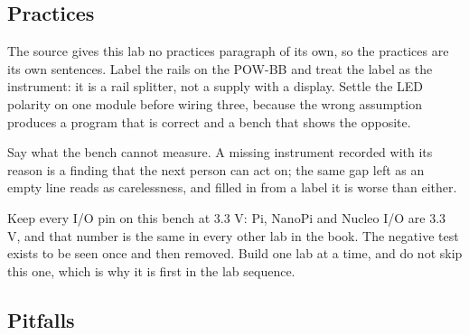 \subsection*{Practices}

The source gives this lab no practices paragraph of its own, so the practices are its own sentences. Label the rails on the POW-BB and treat the label as the instrument: it is a rail splitter, not a supply with a display. Settle the LED polarity on one module before wiring three, because the wrong assumption produces a program that is correct and a bench that shows the opposite.

Say what the bench cannot measure. A missing instrument recorded with its reason is a finding that the next person can act on; the same gap left as an empty line reads as carelessness, and filled in from a label it is worse than either.

Keep every I/O pin on this bench at 3.3 V: Pi, NanoPi and Nucleo I/O are 3.3 V, and that number is the same in every other lab in the book. The negative test exists to be seen once and then removed. Build one lab at a time, and do not skip this one, which is why it is first in the lab sequence.

\subsection*{Pitfalls}

